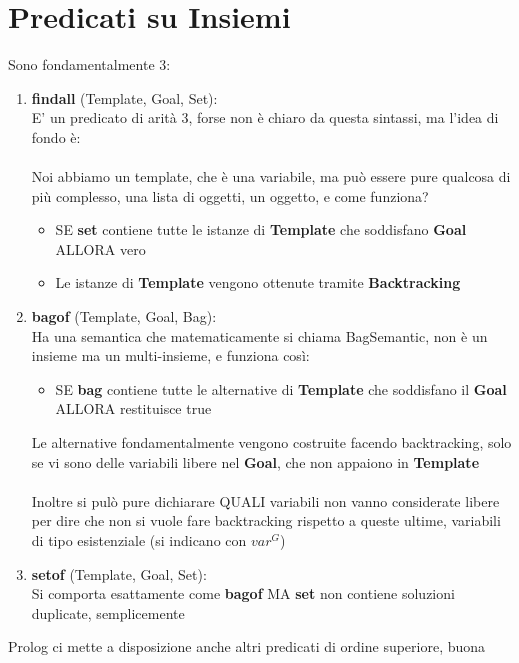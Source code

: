 \documentclass[12pt, a4paper, openany, oneside]{book}
\begin{document}
\section{Predicati su Insiemi}
Sono fondamentalmente 3:
\begin{enumerate}
	\item \color{red}\textbf{findall} \color{black} (Template, Goal, Set):\\
	E' un predicato di arità 3, forse non è chiaro da questa sintassi, ma l'idea
	di fondo è: \\ \\
	Noi abbiamo un template, che è una variabile, ma può essere pure qualcosa di 
	più complesso, una lista di oggetti, un oggetto, e come funziona? 
	\begin{itemize}
		\item SE \textbf{set} contiene \color{red}tutte \color{black} le istanze
		di \textbf{Template} che soddisfano \textbf{Goal} ALLORA vero
		\item Le istanze di \textbf{Template} vengono ottenute tramite 
		\color{red}\textbf{Backtracking}  \color{black}
	\end{itemize}
	\item \color{red}\textbf{bagof} \color{black} (Template, Goal, Bag):\\
	Ha una semantica che matematicamente si chiama BagSemantic, non è un insieme
	ma un multi-insieme, e funziona così:
	\begin{itemize}
		\item SE \textbf{bag} contiene tutte le alternative di \textbf{Template}
		che soddisfano il \textbf{Goal} ALLORA restituisce true
	\end{itemize}
	Le alternative fondamentalmente vengono costruite facendo backtracking, solo se
	vi sono delle variabili libere nel \textbf{Goal}, che non appaiono in
	\textbf{Template}\\ \\
	Inoltre si pulò pure dichiarare QUALI variabili non vanno considerate libere 
	per dire che non si vuole fare backtracking rispetto a queste ultime, 
	variabili di tipo esistenziale (si indicano con $var^{G}$)
	\item \color{red}\textbf{setof} \color{black} (Template, Goal, Set):\\
	Si comporta esattamente come \textbf{bagof} MA \textbf{set} non contiene 
	soluzioni duplicate, semplicemente
\end{enumerate}
Prolog ci mette a disposizione anche altri predicati di ordine superiore, buona
\end{document}
